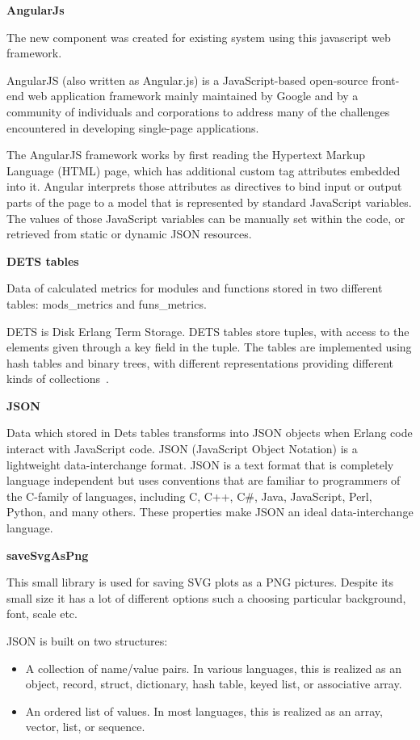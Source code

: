 \textbf{AngularJs}

The new component was created for existing system using this javascript web framework.

AngularJS (also written as Angular.js) is a JavaScript-based open-source front-end web application framework mainly maintained by Google and by a community of individuals and corporations to address many of the challenges encountered in developing single-page applications.

The AngularJS framework works by first reading the Hypertext Markup Language (HTML) page, which has additional custom tag attributes embedded into it. Angular interprets those attributes as directives to bind input or output parts of the page to a model that is represented by standard JavaScript variables. The values of those JavaScript variables can be manually set within the code, or retrieved from static or dynamic JSON resources. 

\textbf{DETS tables}

Data of calculated metrics for modules and functions stored in two different tables: mods\_metrics and funs\_metrics.

DETS is Disk Erlang Term Storage. DETS tables store tuples, with access to the elements given through a  key field in the tuple. The tables are implemented using hash tables and binary trees, with different representations providing different kinds of collections~\cite{erland_o'reilly}.

\textbf{JSON}

Data which stored in Dets tables transforms into JSON objects when Erlang code interact with JavaScript code.
JSON (JavaScript Object Notation) is a lightweight data-interchange format.
JSON is a text format that is completely language independent but uses conventions that are familiar to programmers of the C-family of languages, including C, C++, C\#, Java, JavaScript, Perl, Python, and many others. These properties make JSON an ideal data-interchange language.

\textbf{saveSvgAsPng}

This small library is used for saving SVG plots as a PNG pictures. Despite its small size it has a lot of different options such a choosing particular background, font, scale etc. 

JSON is built on two structures:
\begin{itemize}
	\item A collection of name/value pairs. In various languages, this is realized as an object, record, struct, dictionary, hash table, keyed list, or associative array.
	\item An ordered list of values. In most languages, this is realized as an array, vector, list, or sequence.
\end{itemize}

